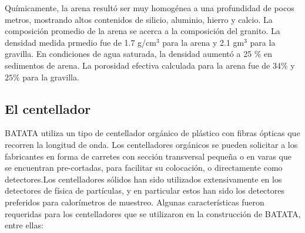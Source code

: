 \documentclass[a4paper,10pt]{article}
\numberwithin{equation}{section}
\begin{document}
\vspace{.3cm}

Químicamente, la arena resultó ser muy homogénea a una profundidad de pocos metros, 
mostrando altos contenidos de silicio, aluminio, hierro y calcio. La composición 
promedio de la arena se acerca a la composición del granito. La densidad medida 
prmedio fue de 1.7 g/cm$^3$ para la arena y 2.1 gm$^3$ para la gravilla. En condiciones 
de agua saturada, la densidad aumentó a 25 \% en sedimentos de arena. La porosidad 
efectiva calculada para la arena fue de $34\%$ y $25\%$ para la gravilla. 

\subsection{El centellador}

BATATA utiliza un tipo de centellador orgánico de plástico con fibras ópticas que
recorren la longitud de onda. Los centelladores orgánicos se pueden solicitar a
los fabricantes en forma de carretes  con sección transversal pequeña o en varas
que se encuentran pre-cortadas, para facilitar su colocación, o directamente como
detectores.Los centelladores sólidos han sido utilizados extensivamente en los detectores 
de física de partículas, y en particular estos han sido los detectores preferidos 
para calorímetros de muestreo. Algunas características fueron requeridas para 
los centelladores que se utilizaron en la construcción de BATATA, entre ellas: 
\end{document}
